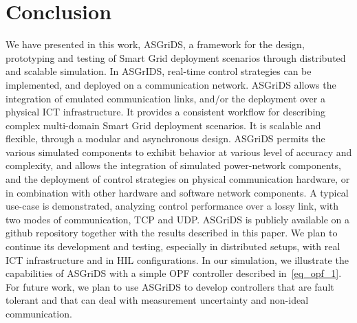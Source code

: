 \documentclass[conference]{IEEEtran}
\begin{document}

\section{Conclusion}
We have presented in this work, ASGriDS, a framework for the design, prototyping and testing of Smart Grid deployment scenarios through distributed and scalable simulation. In ASGrIDS, real-time control strategies can be implemented, and deployed on a communication network. ASGriDS allows the integration of emulated communication links, and/or the deployment over a physical ICT infrastructure. It provides a consistent workflow for describing complex multi-domain Smart Grid deployment scenarios. It is scalable and flexible, through a modular and asynchronous design. ASGriDS permits the various simulated components to exhibit behavior at various level of accuracy and complexity, and allows the integration of simulated power-network components, and the deployment of control strategies on physical communication hardware, or in combination with other hardware and software network components. A typical use-case is demonstrated, analyzing control performance over a lossy link, with two modes of communication, TCP and UDP.
ASGriDS is publicly available on a github repository\cite{TakiennAsgrids} together with the results described in this paper. We plan to continue its development and testing, especially in distributed setups, with real ICT infrastructure and in HIL configurations. In our simulation, we illustrate the capabilities of ASGriDS with a simple OPF controller described in~\eqref{eq_opf_1}. For future work, we plan to use ASGriDS to develop controllers that are fault tolerant and that can deal with measurement uncertainty and non-ideal communication.

  

\end{document}
